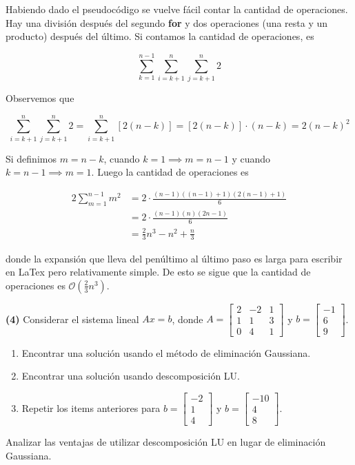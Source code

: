 \documentclass[12pt]{article}
\begin{document}
Habiendo dado el pseudocódigo se vuelve fácil contar la cantidad de operaciones.
Hay una división después del segundo \textbf{for} y dos operaciones (una resta y
un producto) después del último. Si contamos la cantidad de operaciones, es 

\begin{equation*}
    \sum_{k=1}^{n-1}\sum_{i = k+1}^n  \sum_{j=k+1}^n 2 
\end{equation*}

Observemos que 

\begin{equation*}
\sum_{i=k+1}^n \sum_{j=k+1}^n 2 = \sum_{i=k+1}^n [2(n-k)] = [2(n-k)] \cdot (n-k) = 2(n-k)^2
\end{equation*}

Si definimos $m = n-k$, cuando $k=1 \implies m=n-1$ y cuando $k=n-1 \implies
m=1$. Luego la cantidad de operaciones es

\begin{align*}
2\sum_{m=1}^{n-1} m^2 
&= 2 \cdot \frac{(n-1)((n-1)+1)(2(n-1)+1)}{6} \\ 
&= 2 \cdot \frac{(n-1)(n)(2n-1)}{6}\\ 
&=\frac{2}{3}n^3 - n^2 + \frac{n}{3}
\end{align*}

donde la expansión que lleva del penúltimo al último paso es larga para escribir
en LaTex pero relativamente simple. De esto se sigue que la cantidad de
operaciones es $\mathcal{O}\left( \frac{2}{3}n^3 \right) $.

\pagebreak 

\begin{myframe}
    \textbf{(4)} Considerar el sistema lineal $Ax = b$, donde
$
A = \begin{bmatrix} 2 & -2 & 1 \\ 1 & 1 & 3 \\ 0 & 4 & 1 \end{bmatrix}$ y $b = \begin{bmatrix} -1 \\ 6 \\ 9 \end{bmatrix}
$.

\begin{enumerate}
    \item[a)] Encontrar una solución usando el método de eliminación Gaussiana.
    \item[b)] Encontrar una solución usando descomposición LU.
    \item[c)] Repetir los items anteriores para
    $b = \begin{bmatrix} -2 \\ 1 \\ 4 \end{bmatrix}$ y $b = \begin{bmatrix} -10 \\ 4 \\ 8 \end{bmatrix}$.
\end{enumerate}

Analizar las ventajas de utilizar descomposición LU en lugar de eliminación Gaussiana.
\end{myframe}
\end{document}
